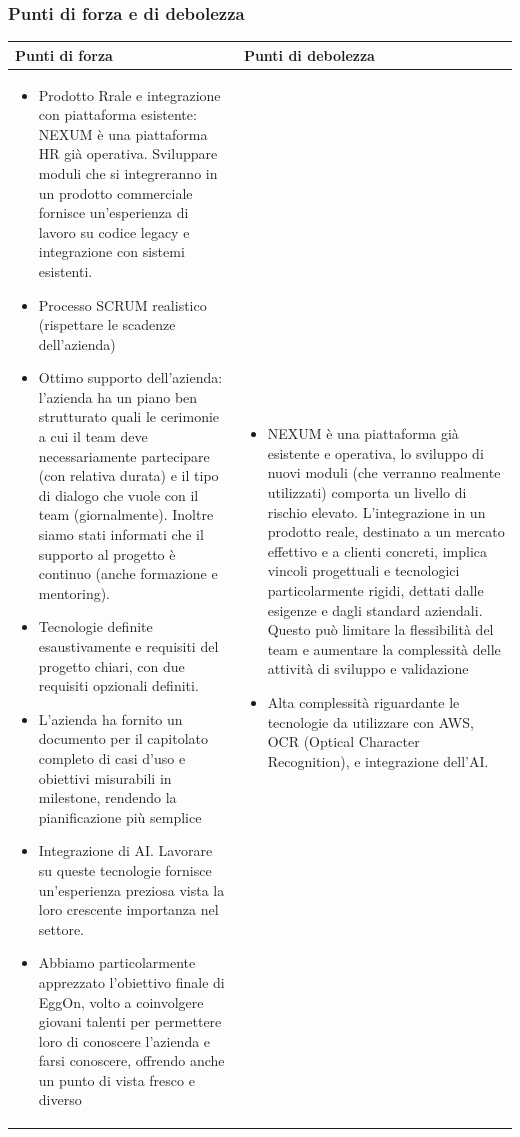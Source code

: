 \documentclass[a4paper,11pt]{article}
\begin{document}
\subsubsection{Punti di forza e di debolezza}
{\footnotesize
\begin{tabularx}{\textwidth}{|X|X|}
\hline
\rowcolor{lightgray!40} %
\textbf{Punti di forza} & \textbf{Punti di debolezza} \\
\hline
\begin{itemize}
\item Prodotto Rrale e integrazione con piattaforma esistente: NEXUM è una piattaforma HR già operativa. Sviluppare moduli che si integreranno in un prodotto commerciale fornisce un'esperienza di lavoro su codice legacy e integrazione con sistemi esistenti.
\item Processo SCRUM realistico (rispettare le scadenze dell’azienda)
\item Ottimo supporto dell’azienda: l’azienda ha un piano ben strutturato quali le cerimonie a cui il team deve necessariamente partecipare (con relativa durata) e il tipo di dialogo che vuole con il team (giornalmente). Inoltre siamo stati informati che il supporto al progetto è continuo (anche formazione e mentoring).
\item Tecnologie definite esaustivamente e  requisiti del progetto chiari, con due requisiti opzionali definiti.
\item L’azienda ha fornito un documento per il capitolato completo di casi d’uso e obiettivi misurabili in milestone, rendendo la pianificazione più semplice
\item Integrazione di AI. Lavorare su queste tecnologie fornisce un'esperienza preziosa vista la loro crescente importanza nel settore.
\item Abbiamo particolarmente apprezzato l’obiettivo finale di EggOn, volto a coinvolgere giovani talenti per permettere loro di conoscere l’azienda e farsi conoscere, offrendo anche un punto di vista fresco e diverso
\end{itemize}
& 
\begin{itemize}
\item NEXUM è una piattaforma già esistente e operativa, lo sviluppo di nuovi moduli (che verranno realmente utilizzati) comporta un livello di rischio elevato. L’integrazione in un prodotto reale, destinato a un mercato effettivo e a clienti concreti, implica vincoli progettuali e tecnologici particolarmente rigidi, dettati dalle esigenze e dagli standard aziendali. Questo può limitare la flessibilità del team e aumentare la complessità delle attività di sviluppo e validazione
\item Alta complessità riguardante le tecnologie da utilizzare con AWS, OCR (Optical Character Recognition), e integrazione dell’AI.
\end{itemize} \\
\hline
\end{tabularx}
}
\end{document}

